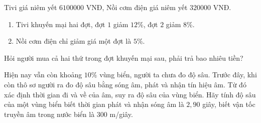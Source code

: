 \begin{bt}%
	Tivi giá niêm yết $6100000$ VNĐ, Nồi cơm điện giá niêm yết $320000$ VNĐ.
	\begin{enumerate}
		\item Tivi khuyến mại hai đợt, đợt $1$ giảm $12$\%, đợt $2$ giảm $8$\%.
		\item Nồi cơm điện chỉ giảm giá một đợt là $5$\%.
	\end{enumerate}
Hỏi người mua cả hai thứ trong đợt khuyến mại sau, phải trả bao nhiêu tiền? 
\end{bt}

\begin{bt}%
	Hiện nay vẫn còn khoảng $10\%$ vùng biển, người ta chưa đo độ sâu. Trước đây, khi còn thô sơ người ra đo độ sâu bằng sóng âm, phát và nhận tín hiệu âm. Từ đó xác định thời gian đi và về của âm, suy ra độ sâu của vùng biển. Hãy tính độ sâu của một vùng biển biết thời gian phát và nhận sóng âm là $2{,}90$ giây, biết vận tốc truyền âm trong nước biển là $300$ m/giây.
\end{bt}

